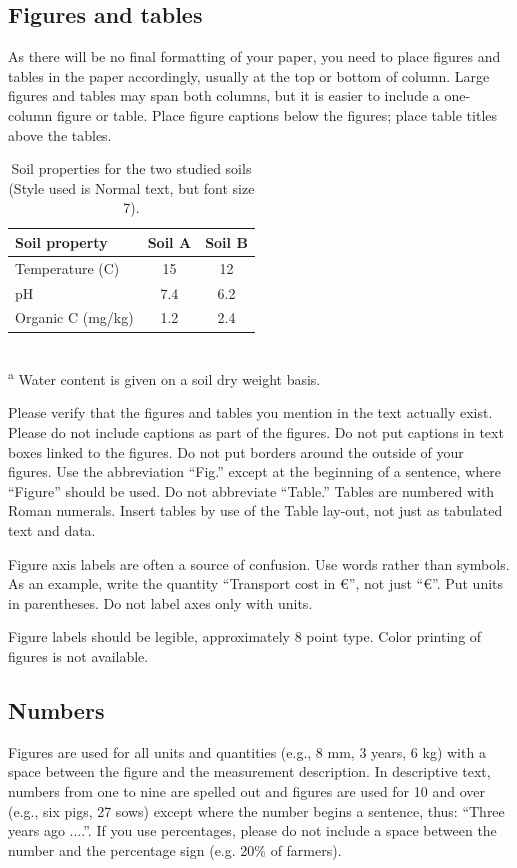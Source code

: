 \documentclass[english]{oegatb}
\begin{document}
\subsection{Figures and tables}
As there will be no final formatting of your paper,
you need to place figures and tables in the paper accordingly,
usually at the top or bottom of column.
Large figures and tables may span both columns,
but it is easier to include a one-column figure or table.
Place figure captions below the figures; place table titles above the tables.

\begin{table}[H]
\caption{Soil properties for the two studied soils
(Style used is Normal text, but font size 7).}
\scriptsize
\renewcommand{\arraystretch}{1.1}
\begin{tabularx}{\columnwidth}{Xcc}
\hline
Soil property     & Soil A & Soil B\\
\hline
Temperature (C)   &     15 &     12\\
pH                &    7.4 &    6.2\\
Organic C (mg/kg) &    1.2 &    2.4\\
\hline
\end{tabularx}\\
\textsuperscript{a} Water content is given on a soil dry weight basis.
\end{table}

Please verify that the figures and tables you mention in the text
actually exist. Please do not include captions as part of the figures.
Do not put captions in text boxes linked to the figures.
Do not put borders around the outside of your figures.
Use the abbreviation ``Fig.'' except at the beginning of a sentence,
where ``Figure'' should be used.
Do not abbreviate ``Table.''
Tables are numbered with Roman numerals.
Insert tables by use of the Table lay-out, not just as tabulated text and data.

Figure axis labels are often a source of confusion.
Use words rather than symbols.
As an example, write the quantity ``Transport cost in \euro'', not just ``\euro''.
Put units in parentheses.
Do not label axes only with units.

Figure labels should be legible, approximately 8 point type.
Color printing of figures is not available.

\subsection{Numbers}
Figures are used for all units and quantities (e.g., 8 mm, 3 years, 6 kg)
with a space between the figure and the measurement description.
In descriptive text, numbers from one to nine are spelled out
and figures are used for 10 and over (e.g., six pigs, 27 sows)
except where the number begins a sentence,
thus: ``Three years ago ....''.
If you use percentages, please do not include a space between the number
and the percentage sign (e.g. 20\% of farmers).
\end{document}
